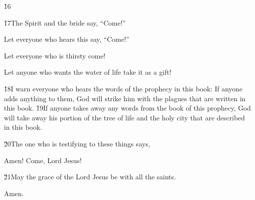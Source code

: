 \v{16}

\v{17}The Spirit and the bride say, ``Come!''

Let everyone who hears this say, ``Come!''

Let everyone who is thirsty come!

Let anyone who wants the water of life take it as a gift!

\v{18}I warn everyone who hears the words of the prophecy in this book: If anyone adds anything to them, God will strike him with the plagues that are written in this book. \v{19}If anyone takes away any words from the book of this prophecy, God will take away his portion of the tree of life and the holy city that are described in this book.

\v{20}The one who is testifying to these things says, 

Amen! Come, Lord Jesus!

\v{21}May the grace of the Lord Jesus be with all the saints.

Amen.
